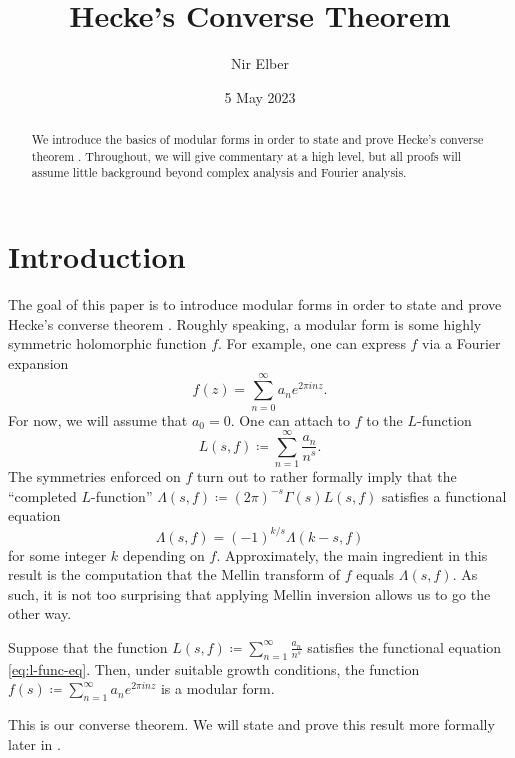 \documentclass{amsart}
\title{Hecke's Converse Theorem}
\author{Nir Elber}
\date{5 May 2023}
\begin{document}
\begin{abstract}
	\noindent We introduce the basics of modular forms in order to state and prove Hecke's converse theorem \cite{hecke-converse}. Throughout, we will give commentary at a high level, but all proofs will assume little background beyond complex analysis and Fourier analysis.
\end{abstract}

\maketitle

\setcounter{tocdepth}{2}

\section{Introduction}
The goal of this paper is to introduce modular forms in order to state and prove Hecke's converse theorem \cite{hecke-converse}. Roughly speaking, a modular form is some highly symmetric holomorphic function $f$. For example, one can express $f$ via a Fourier expansion
\[f(z)=\sum_{n=0}^\infty a_ne^{2\pi inz}.\]
For now, we will assume that $a_0=0$. One can attach to $f$ to the $L$-function
\[L(s,f)\coloneqq\sum_{n=1}^\infty\frac{a_n}{n^s}.\]
The symmetries enforced on $f$ turn out to rather formally imply that the ``completed $L$-function'' $\Lambda(s,f)\coloneqq(2\pi)^{-s}\Gamma(s)L(s,f)$ satisfies a functional equation
\begin{equation}
	\Lambda(s,f)=(-1)^{k/s}\Lambda(k-s,f) \label{eq:l-func-eq}
\end{equation}
for some integer $k$ depending on $f$. Approximately, the main ingredient in this result is the computation that the Mellin transform of $f$ equals $\Lambda(s,f)$. As such, it is not too surprising that applying Mellin inversion allows us to go the other way.
\begin{theorem}[Hecke]
	Suppose that the function $L(s,f)\coloneqq\sum_{n=1}^\infty\frac{a_n}{n^s}$ satisfies the functional equation \eqref{eq:l-func-eq}. Then, under suitable growth conditions, the function $f(s)\coloneqq\sum_{n=1}^\infty a_ne^{2\pi inz}$ is a modular form.
\end{theorem}
This is our converse theorem. We will state and prove this result more formally later in .
\end{document}

